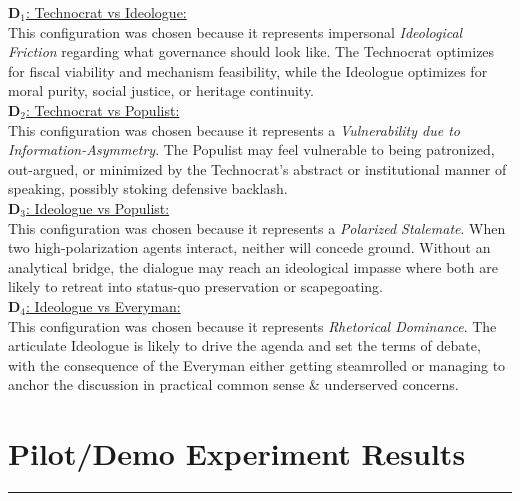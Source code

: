 \documentclass[titlepage]{article}
\begin{document}
\underline{$\boldsymbol{D}_1$: Technocrat vs Ideologue:}\\
This configuration was chosen because it represents impersonal \textit{Ideological Friction} regarding what governance should look like. The Technocrat optimizes for fiscal viability and mechanism feasibility, while the Ideologue optimizes for moral purity, social justice, or heritage continuity.\\

\underline{$\boldsymbol{D}_2$: Technocrat vs Populist:}\\
This configuration was chosen because it represents a \textit{Vulnerability due to Information-Asymmetry}. The Populist may feel vulnerable to being patronized, out-argued, or minimized by the Technocrat's abstract or institutional manner of speaking, possibly stoking defensive backlash.\\

\underline{$\boldsymbol{D}_3$: Ideologue vs Populist:}\\
This configuration was chosen because it represents a \textit{Polarized Stalemate}. When two high-polarization agents interact, neither will concede ground. Without an analytical bridge, the dialogue may reach an ideological impasse where both are likely to retreat into status-quo preservation or scapegoating.\\

\underline{$\boldsymbol{D}_4$: Ideologue vs Everyman:}\\
This configuration was chosen because it represents \textit{Rhetorical Dominance}. The articulate Ideologue is likely to drive the agenda and set the terms of debate, with the consequence of the Everyman either getting steamrolled or managing to anchor the discussion in practical common sense \& underserved concerns.

\newpage{}

\section{Pilot/Demo Experiment Results}
\label{sec:taskdescription}
\rule{\textwidth}{0.4pt}

\newcommand{\cmark}{\textcolor{green!60!black}{\ding{51}}}
\newcommand{\xmark}{\textcolor{red}{\ding{55}}}
\end{document}
